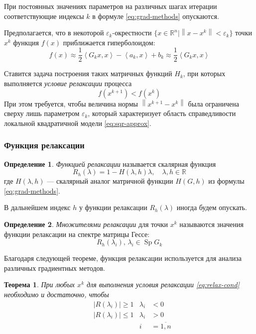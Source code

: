 \documentclass{article}
\renewcommand{\epsilon}{\varepsilon}
\renewcommand{\leq}{\leqslant}
\renewcommand{\geq}{\geqslant}
\providecommand{\neword}{\emph}
\providecommand{\abs}[1]{\left \lvert{#1}\right \rvert}
\providecommand{\norm}[1]{\left \lVert{#1}\right \rVert}
\providecommand{\set}[1]{\mathbb{#1}}
\newcommand{\scalmult}[1]{{\left \langle #1 \right \rangle}}
\DeclareMathOperator{\Sp}{Sp}
\newtheorem{thm}{Теорема}[section]
\theoremstyle{remark}
\theoremstyle{definition}
\newtheorem{dfn}{Определение}[section]
\numberwithin{equation}{section}
\begin{document}
При постоянных значениях параметров на различных шагах итерации
соответствующие индексы $k$ в формуле \eqref{eq:grad-methods}
опускаются.

Предполагается, что в некоторой $\epsilon_k$-окрестности $\{x \in
\set{R}^n | \norm{x-x^k} < \epsilon_k\}$ точки $x^k$ функция $f(x)$
приближается гиперболоидом:
\begin{equation}
  \label{eq:sqr-approx}
  f(x) \approx \frac{1}{2}\scalmult{G_k x, x} - \scalmult{a_k,x} + b_k \approx \frac{1}{2}\scalmult{G_k x, x}
\end{equation}

Ставится задача построения таких матричных функций $H_k$, при которых
выполняется \neword{условие релаксации} процесса
\begin{equation}
  \label{eq:relax-cond}
  f(x^{k+1}) < f(x^k)
\end{equation}
При этом требуется, чтобы величина нормы $\norm{x^{k+1}-x^{k}}$ была
ограничена сверху лишь параметром $\epsilon_k$, который характеризует
область справедливости локальной квадратичной модели
\eqref{eq:sqr-approx}.

\subsubsection{Функция релаксации}

\begin{dfn}
  \neword{Функцией релаксации} называется скалярная функция
  \begin{equation}
    \label{eq:relax-fun}
    R_h(\lambda) = 1 - H(\lambda, h)\lambda,\quad \lambda,h \in \set{R}
  \end{equation}
  где $H(\lambda, h)$ — скалярный аналог матричной функции $H(G, h)$
  из формулы \eqref{eq:grad-methods}.
\end{dfn}
В дальнейшем индекс $h$ у функции релаксации $R_h(\lambda)$ иногда
будем опускать.

\begin{dfn}
  \neword{Множителями релаксации} для точки $x^k$ называются значения
  функции релаксации на спектре матрицы Гессе:
  \begin{equation}
    \label{eq:relax-fac}
    R_h(\lambda_i),\, \lambda_i \in \Sp{G_k}
  \end{equation}
\end{dfn}

Благодаря следующей теореме, функция релаксации используется для
анализа различных градиентных методов.

\begin{thm}
  \label{thm:relax-thm}
  При любых $x^k$ для выполнения условия релаксации
  \eqref{eq:relax-cond} необходимо и достаточно, чтобы
  \begin{equation}
    \label{eq:relax-thm}
    \begin{aligned}
      & \abs{R(\lambda_i)} \geq 1 & \lambda_i& < 0 \\
      & \abs{R(\lambda_i)} \leq 1 & \lambda_i& > 0\\
      &&i& = \overline{1, n}
    \end{aligned}
  \end{equation}
\end{thm}
\end{document}
